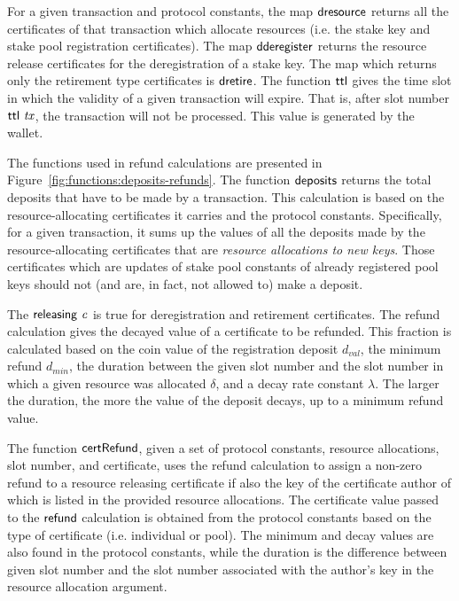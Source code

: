 \documentclass[11pt,a4paper,dvipsnames]{article}
\theoremstyle{definition}
\theoremstyle{definition}
\begin{document}
For a given transaction and protocol constants, the map $\mathsf{dresource}$
returns all the certificates of that transaction which allocate resources
(i.e. the stake key and stake pool registration certificates). The map
$\mathsf{dderegister}$ returns the resource release certificates for the
deregistration of a stake key. The map which returns only
the retirement type certificates is $\mathsf{dretire}$. The function $\mathsf{ttl}$ gives the
time slot in which the validity of a given transaction will expire. That is,
after slot number $\mathsf{ttl}~\mathit{tx}$, the transaction will not be processed.
This value is generated by the wallet.

The functions used in refund calculations are presented in
Figure~\ref{fig:functions:deposits-refunds}.
The function
$\mathsf{deposits}$ returns the total deposits that have to be made by a transaction.
This calculation is
based on the resource-allocating certificates it carries and the protocol constants.
Specifically, for a given transaction,
it sums up the values of all the deposits made by the resource-allocating
certificates that are \textit{resource allocations to new keys}.  Those
certificates which are
updates of stake pool constants of already registered pool keys should not
(and are, in fact, not allowed to) make a deposit.

The $\mathsf{releasing}~\mathit{c}$ is true for deregistration and retirement
certificates. The refund calculation gives the decayed value of a
certificate to be refunded. This fraction is calculated
based on the coin value of the registration deposit $d_{val}$, the minimum
refund $d_{min}$, the
duration between the given slot number and the slot number in
which a given resource was allocated $\delta$, and a decay rate constant $\lambda$.
The larger the duration, the more
the value of the deposit decays, up to a minimum refund value.

The function $\mathsf{certRefund}$, given a set of protocol constants, resource
allocations, slot number, and certificate, uses the refund calculation to
assign a non-zero refund to a resource releasing certificate if also the key of
the certificate author of which is listed in the provided resource allocations.
The certificate value passed to the $\mathsf{refund}$ calculation is obtained from
the protocol constants based on the type of certificate (i.e. individual or pool).
The minimum and decay values are also found in the protocol constants, while
the duration is the difference between given slot number and the slot
number associated with the author's key in the resource allocation argument.
\end{document}
